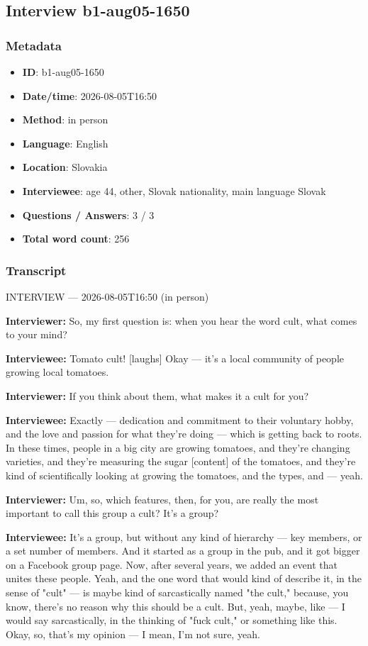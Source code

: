 \subsection{Interview b1-aug05-1650}\label{int:b1-aug05-1650}
\subsubsection*{Metadata}
\begin{itemize}
  \item \textbf{ID}: b1-aug05-1650
  \item \textbf{Date/time}: 2026-08-05T16:50
  \item \textbf{Method}: in person
  \item \textbf{Language}: English
  \item \textbf{Location}: Slovakia
  \item \textbf{Interviewee}: age 44, other, Slovak nationality, main language Slovak
  \item \textbf{Questions / Answers}: 3 / 3
  \item \textbf{Total word count}: 256
\end{itemize}
\subsubsection*{Transcript}
INTERVIEW — 2026-08-05T16:50 (in person)

\textbf{Interviewer:} So, my first question is: when you hear the word cult, what comes to your mind?

\textbf{Interviewee:} Tomato cult! [laughs] Okay — it's a local community of people growing local tomatoes.

\textbf{Interviewer:} If you think about them, what makes it a cult for you?

\textbf{Interviewee:} Exactly — dedication and commitment to their voluntary hobby, and the love and passion for what they're doing — which is getting back to roots. In these times, people in a big city are growing tomatoes, and they're changing varieties, and they're measuring the sugar [content] of the tomatoes, and they're kind of scientifically looking at growing the tomatoes, and the types, and — yeah.

\textbf{Interviewer:} Um, so, which features, then, for you, are really the most important to call this group a cult? It's a group?

\textbf{Interviewee:} It's a group, but without any kind of hierarchy — key members, or a set number of members. And it started as a group in the pub, and it got bigger on a Facebook group page. Now, after several years, we added an event that unites these people. Yeah, and the one word that would kind of describe it, in the sense of "cult" — is maybe kind of sarcastically named "the cult," because, you know, there's no reason why this should be a cult. But, yeah, maybe, like — I would say sarcastically, in the thinking of "fuck cult," or something like this. Okay, so, that's my opinion — I mean, I'm not sure, yeah.

